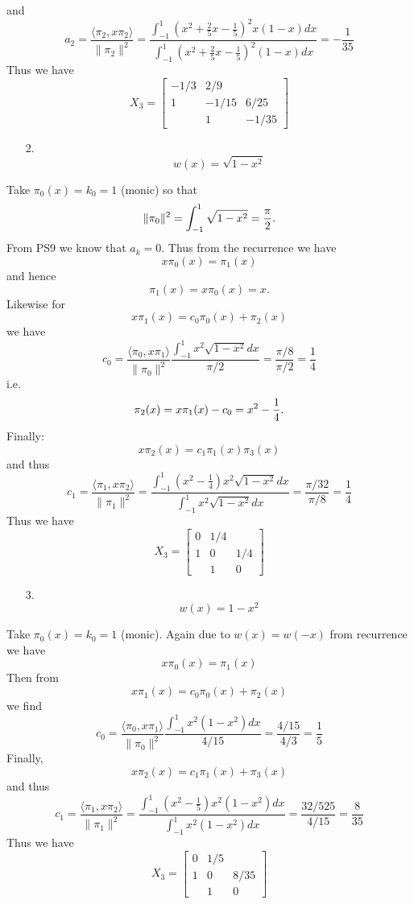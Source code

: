 \documentclass[12pt,a4paper]{article}
\begin{document}
and
\[
a_2 = \frac{\ensuremath{\langle} \ensuremath{\pi}_2, x\ensuremath{\pi}_2\ensuremath{\rangle}}{\|\ensuremath{\pi}_2\|^2} = \frac{\int_{-1}^1 (x^2+\frac{2}{5}x- \frac{1}{5})^2 x(1-x) dx}{\int_{-1}^1 (x^2+\frac{2}{5}x- \frac{1}{5})^2 (1-x) dx}= -\frac{1}{35}
\]
Thus we have
\[
X_3 = \begin{bmatrix}
-1/3 & 2/9 \\
1 & -1/15 & 6/25 \\
& 1 & -1/35
\end{bmatrix}
\]
\begin{itemize}
\item[2. ] \[
w(x)=\sqrt{1-x^2}
\]
\end{itemize}
Take $\ensuremath{\pi}_0(x) = k_0 = 1$ (monic) so that
\[
\|\ensuremath{\pi}_0\|^2 = \int_{-1}^1 \sqrt{1-x^2} = {\ensuremath{\pi} \over 2}.
\]
From PS9 we know that $a_k = 0$. Thus from the recurrence we have
\[
x\ensuremath{\pi}_0(x) =  \ensuremath{\pi}_1(x)
\]
and hence
\[
\ensuremath{\pi}_1(x) = x \ensuremath{\pi}_0(x) = x.
\]
Likewise for
\[
x\ensuremath{\pi}_1(x)= c_0\ensuremath{\pi}_0(x)+\ensuremath{\pi}_2(x)
\]
we have
\[
c_0=\frac{\ensuremath{\langle} \ensuremath{\pi}_0, x\ensuremath{\pi}_1\ensuremath{\rangle}}{\|\ensuremath{\pi}_0\|^2} \frac{\int_{-1}^1 x^2\sqrt{1-x^2} dx}{\ensuremath{\pi}/2}=\frac{\ensuremath{\pi}/8}{\ensuremath{\pi}/2}= \frac{1}{4}
\]
i.e.
\[
\ensuremath{\pi}_2(x) = x\ensuremath{\pi}_1(x) - c_0 = x^2 - {1 \over 4}.
\]
Finally:
\[
x\ensuremath{\pi}_2(x)= c_1\ensuremath{\pi}_1(x)\ensuremath{\pi}_3(x)
\]
and thus
\[
c_1=\frac{\ensuremath{\langle} \ensuremath{\pi}_1, x\ensuremath{\pi}_2\ensuremath{\rangle}}{\|\ensuremath{\pi}_1\|^2}= \frac{\int_{-1}^1 (x^2- \frac{1}{4}) x^2\sqrt{1-x^2} dx}{\int_{-1}^1 x^2 \sqrt{1-x^2} dx}= \frac{\ensuremath{\pi}/32}{\ensuremath{\pi}/8}=\frac{1}{4}
\]
Thus we have
\[
X_3 = \begin{bmatrix}
0 & 1/4 \\
1 & 0 & 1/4 \\
& 1 & 0
\end{bmatrix}
\]
\begin{itemize}
\item[3. ] \[
w(x)=1-x^2
\]
\end{itemize}
Take $\ensuremath{\pi}_0(x) = k_0 = 1$ (monic). Again due to $w(x) = w(-x)$ from recurrence we have
\[
x\ensuremath{\pi}_0(x) = \ensuremath{\pi}_1(x)
\]
Then from
\[
x\ensuremath{\pi}_1(x)= c_0\ensuremath{\pi}_0(x)+\ensuremath{\pi}_2(x)
\]
we find
\[
c_0=\frac{\ensuremath{\langle} \ensuremath{\pi}_0, x\ensuremath{\pi}_1\ensuremath{\rangle}}{\|\ensuremath{\pi}_0\|^2} \frac{\int_{-1}^1 x^2(1-x^2) dx}{4/15}=\frac{4/15}{4/3}= \frac{1}{5}
\]
Finally,
\[
x\ensuremath{\pi}_2(x)= c_1\ensuremath{\pi}_1(x)+\ensuremath{\pi}_3(x)
\]
and thus
\[
c_1=\frac{\ensuremath{\langle} \ensuremath{\pi}_1, x\ensuremath{\pi}_2\ensuremath{\rangle}}{\|\ensuremath{\pi}_1\|^2}= \frac{\int_{-1}^1 (x^2- \frac{1}{5}) x^2(1-x^2) dx}{\int_{-1}^1 x^2 (1-x^2) dx}= \frac{32/525}{4/15}=\frac{8}{35}
\]
Thus we have
\[
X_3 = \begin{bmatrix}
0 & 1/5 \\
1 & 0 & 8/35 \\
& 1 & 0
\end{bmatrix}
\]
\end{document}
